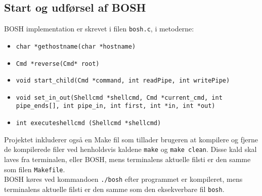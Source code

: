 \subsection{Start og udførsel af BOSH}
BOSH implementation er skrevet i filen \verb+bosh.c+, i metoderne:
\begin{itemize}
	\item \texttt{char *gethostname(char *hostname)}
	\item \texttt{Cmd *reverse(Cmd* root)}
	\item \texttt{void start\_child(Cmd *command, int readPipe, int writePipe)}
	\item \texttt{void set\_in\_out(Shellcmd *shellcmd, Cmd *current\_cmd, int pipe\_ends[], int pipe\_in, int first, int *in, int *out)}
	\item \texttt{int executeshellcmd (Shellcmd *shellcmd)}
\end{itemize}

Projektet inkluderer også en Make fil som tillader brugeren at kompilere og fjerne de kompilerede filer ved henholdsvis kaldene \verb+make+ og \verb+make clean+. Disse kald skal laves fra terminalen, eller BOSH, mens terminalens aktuelle filsti er den samme som filen \verb+Makefile+.\\

BOSH køres ved kommandoen \verb+./bosh+ efter programmet er kompileret, mens terminalens aktuelle filsti er den samme som den eksekverbare fil \verb+bosh+.